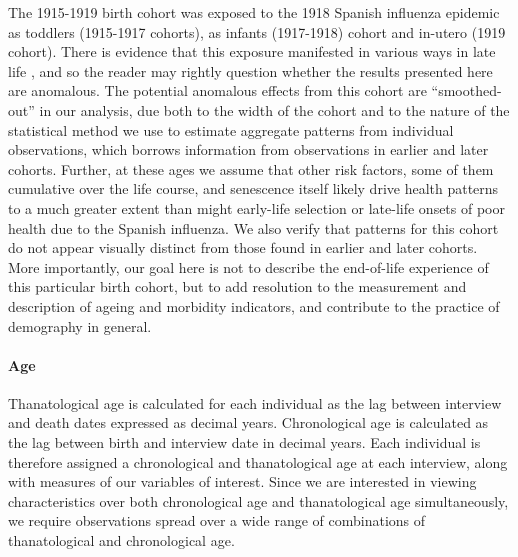 \documentclass[11pt,oneside]{article} %
\begin{document}
The 1915-1919 birth cohort was exposed to the 1918 Spanish influenza
epidemic as toddlers (1915-1917 cohorts), as infants (1917-1918) cohort and
in-utero (1919 cohort). There is evidence that this exposure manifested in
various ways in late life \citep[e.g.,][]{almond20061918,myrskyla2013early}, and
so the reader may rightly question whether the results presented here are anomalous.
The potential anomalous effects from this cohort are
``smoothed-out'' in our analysis, due both to the width of the cohort and to the
nature of the statistical method we use to estimate aggregate patterns from
individual observations, which borrows information from observations in earlier
and later cohorts. Further, at these ages we assume that other risk factors,
some of them cumulative over the life course, and senescence itself likely drive
health patterns to a much greater extent than might early-life selection or
late-life onsets of poor health due to the Spanish influenza.
We also verify that patterns for this cohort do not appear visually distinct
from those found in earlier and later cohorts. More importantly, our goal here
is not to describe the end-of-life experience of this particular birth cohort, but to add
resolution to the measurement and description of ageing and morbidity
indicators, and contribute to the practice of demography in general. 

\paragraph*{Age}
Thanatological age is calculated for each individual as the lag between
interview and death dates expressed as decimal years. Chronological age is
calculated as the lag between birth and interview date in decimal years. Each
individual is therefore assigned a chronological and thanatological age at each
interview, along with measures of our variables of interest. Since
we are interested in viewing characteristics over both chronological age and
thanatological age simultaneously, we require observations spread over a wide
range of combinations of thanatological and chronological age.
\end{document}

